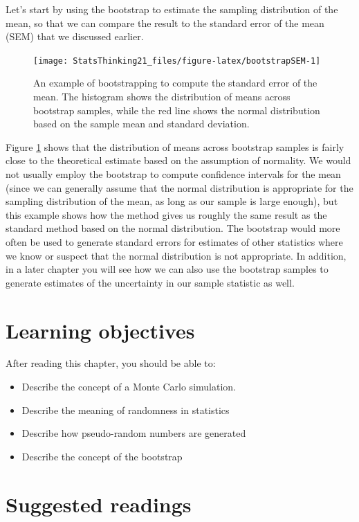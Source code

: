 \documentclass[12pt,]{book}
\providecommand{\tightlist}{%
  \setlength{\itemsep}{0pt}\setlength{\parskip}{0pt}}
\theoremstyle{definition}
\theoremstyle{definition}
\theoremstyle{definition}
\theoremstyle{remark}
\begin{document}
Let's start by using the bootstrap to estimate the sampling distribution of the mean, so that we can compare the result to the standard error of the mean (SEM) that we discussed earlier.

\begin{figure}
\texttt{[image: StatsThinking21\_files/figure-latex/bootstrapSEM-1]} \caption{An example of bootstrapping to compute the standard error of the mean. The histogram shows the distribution of means across bootstrap samples, while the red line shows the normal distribution based on the sample mean and standard deviation.}\label{fig:bootstrapSEM}
\end{figure}

Figure \ref{fig:bootstrapSEM} shows that the distribution of means across bootstrap samples is fairly close to the theoretical estimate based on the assumption of normality. We would not usually employ the bootstrap to compute confidence intervals for the mean (since we can generally assume that the normal distribution is appropriate for the sampling distribution of the mean, as long as our sample is large enough), but this example shows how the method gives us roughly the same result as the standard method based on the normal distribution. The bootstrap would more often be used to generate standard errors for estimates of other statistics where we know or suspect that the normal distribution is not appropriate. In addition, in a later chapter you will see how we can also use the bootstrap samples to generate estimates of the uncertainty in our sample statistic as well.

\hypertarget{learning-objectives-7}{%
\section{Learning objectives}\label{learning-objectives-7}}

After reading this chapter, you should be able to:

\begin{itemize}
\tightlist
\item
  Describe the concept of a Monte Carlo simulation.
\item
  Describe the meaning of randomness in statistics
\item
  Describe how pseudo-random numbers are generated
\item
  Describe the concept of the bootstrap
\end{itemize}

\hypertarget{suggested-readings-5}{%
\section{Suggested readings}\label{suggested-readings-5}}
\end{document}

